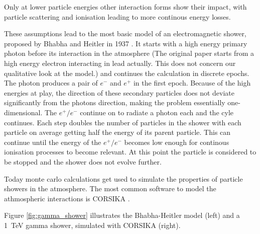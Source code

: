 Only at lower particle energies other interaction forms show their impact,
with particle scattering and ionisation 
leading to more continous energy losses.

These assumptions lead to the most basic model of an 
electromagnetic shower, proposed by Bhabha and Heitler in 1937
\cite{doi:10.1098/rspa.1937.0082}.
It starts with a high energy primary photon before its interaction in the atmosphere 
(The original paper starts from a high energy electron interacting in lead actually.
This does not concern our qualitative look at the model.) and continues 
the calculation in discrete epochs.
The photon produces a pair of $e^-$ and $e^+$ in the first epoch.
Because of the high energies at play, the direction of these secondary 
particles does not deviate significantly from the photons direction, 
making the problem essentially one-dimensional.
The $e^+/e^-$ continue on to radiate a photon each and the cyle continues.
Each step doubles the number of particles in the shower with each particle 
on average getting half the energy of its parent particle.
This can continue until the energy of the $e^+/e^-$ becomes low enough for
continous ionisation processes to become relevant.
At this point the particle is considered to be stopped and the shower
does not evolve further.

Today monte carlo calculations get used to simulate the properties 
of particle showers in the atmosphere.
The most common software to model the athmospheric interactions is
CORSIKA \cite{Engel:2018akg}.

Figure \ref{fig:gamma_shower} illustrates the Bhabha-Heitler model (left)
and a \SI{1}{\tera\electronvolt} gamma shower, simulated with CORSIKA (right).

